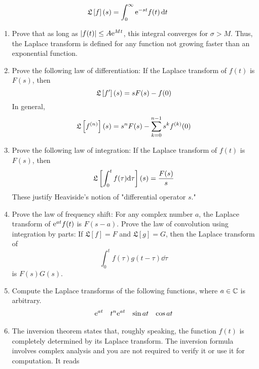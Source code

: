 \documentclass[../psets.tex]{subfiles}
\begin{document}
\begin{enumerate}
    \begin{equation*}
        \Lap{f}{s} = \int_0^\infty\e[-st]f(t)\dd{t}
    \end{equation*}
    \begin{enumerate}
        \item Prove that as long as $|f(t)|\leq A\e[Mt]$, this integral converges for $\sigma>M$. Thus, the Laplace transform is defined for any function not growing faster than an exponential function.
        \item Prove the following law of differentiation: If the Laplace transform of $f(t)$ is $F(s)$, then
        \begin{equation*}
            \Lap{f'}{s} = sF(s)-f(0)
        \end{equation*}
        In general,
        \begin{equation*}
            \Lap{f^{(n)}}{s} = s^nF(s)-\sum_{k=0}^{n-1}s^kf^{(k)}(0)
        \end{equation*}
        \item Prove the following law of integration: If the Laplace transform of $f(t)$ is $F(s)$, then
        \begin{equation*}
            \Lap{\int_0^tf(\tau)\dd\tau}{s} = \frac{F(s)}{s}
        \end{equation*}
        These justify Heaviside's notion of "differential operator $s$."
        \item Prove the law of frequency shift: For any complex number $a$, the Laplace transform of $\e[at]f(t)$ is $F(s-a)$. Prove the law of convolution using integration by parts: If $\mathfrak{L}[f]=F$ and $\mathfrak{L}[g]=G$, then the Laplace transform of
        \begin{equation*}
            \int_0^tf(\tau)g(t-\tau)\dd\tau
        \end{equation*}
        is $F(s)G(s)$.
        \item Compute the Laplace transforms of the following functions, where $a\in\C$ is arbitrary.
        \begin{align*}
            \e[at]&&
            t^n\e[at]&&
            \sin at&&
            \cos at
        \end{align*}
        \item The inversion theorem states that, roughly speaking, the function $f(t)$ is completely determined by its Laplace transform. The inversion formula involves complex analysis and you are not required to verify it or use it for computation. It reads
        \begin{equation*}

\end{equation*}
\end{enumerate}
\end{enumerate}
\end{document}
